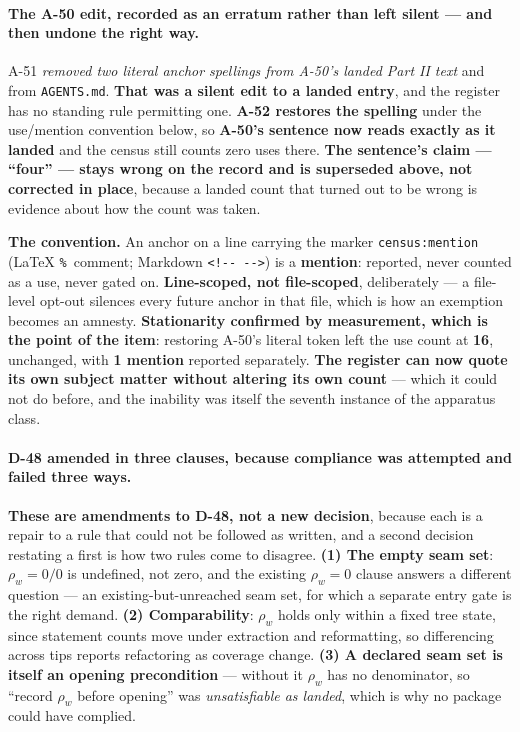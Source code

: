 \documentclass[
  10pt,
]{article}
\begin{document}
\paragraph{The A-50 edit, recorded as an erratum rather than left silent --- and then undone the right way.}
A-51 \emph{removed two literal anchor spellings from A-50's landed Part II text} and from \texttt{AGENTS.md}. \textbf{That was a silent edit to a landed entry}, and the register has no standing rule permitting one. \textbf{A-52 restores the spelling} under the use/mention convention below, so \textbf{A-50's sentence now reads exactly as it landed} and the census still counts zero uses there. \textbf{The sentence's claim --- ``four'' --- stays wrong on the record and is superseded above, not corrected in place}, because a landed count that turned out to be wrong is evidence about how the count was taken.

\textbf{The convention.} An anchor on a line carrying the marker \texttt{census:mention} (LaTeX \texttt{\%}~comment; Markdown \texttt{<!-{}-~-{}->}) is a \textbf{mention}: reported, never counted as a use, never gated on. \textbf{Line-scoped, not file-scoped}, deliberately --- a file-level opt-out silences every future anchor in that file, which is how an exemption becomes an amnesty. \textbf{Stationarity confirmed by measurement, which is the point of the item}: restoring A-50's literal token left the use count at \textbf{16}, unchanged, with \textbf{1 mention} reported separately. \textbf{The register can now quote its own subject matter without altering its own count} --- which it could not do before, and the inability was itself the seventh instance of the apparatus class.

\paragraph{D-48 amended in three clauses, because compliance was attempted and failed three ways.}
\textbf{These are amendments to D-48, not a new decision}, because each is a repair to a rule that could not be followed as written, and a second decision restating a first is how two rules come to disagree. \textbf{(1) The empty seam set}: $\rho_w = 0/0$ is undefined, not zero, and the existing $\rho_w = 0$ clause answers a different question --- an existing-but-unreached seam set, for which a separate entry gate is the right demand. \textbf{(2) Comparability}: $\rho_w$ holds only within a fixed tree state, since statement counts move under extraction and reformatting, so differencing across tips reports refactoring as coverage change. \textbf{(3) A declared seam set is itself an opening precondition} --- without it $\rho_w$ has no denominator, so ``record $\rho_w$ before opening'' was \emph{unsatisfiable as landed}, which is why no package could have complied.
\end{document}
